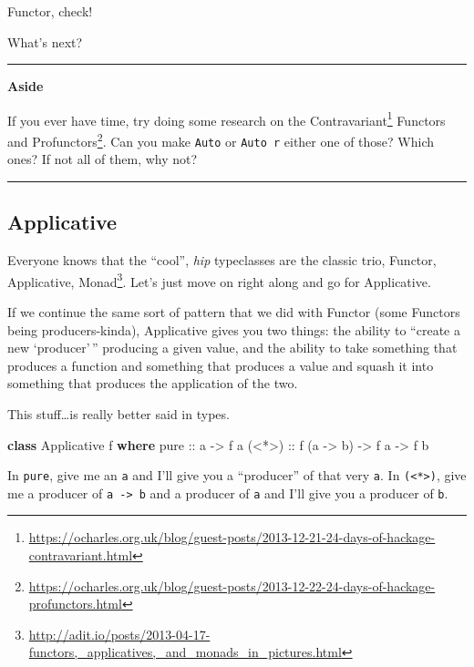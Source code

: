 \documentclass[]{article}
\newenvironment{Shaded}{}{}
\newcommand{\DataTypeTok}[1]{\textcolor[rgb]{0.56,0.13,0.00}{#1}}
\newcommand{\KeywordTok}[1]{\textcolor[rgb]{0.00,0.44,0.13}{\textbf{#1}}}
\newcommand{\NormalTok}[1]{#1}
\newcommand{\OtherTok}[1]{\textcolor[rgb]{0.00,0.44,0.13}{#1}}
\renewcommand{\href}[2]{#2\footnote{\url{#1}}}
\begin{document}
Functor, check!

What's next?

\begin{center}\rule{0.5\linewidth}{\linethickness}\end{center}

\textbf{Aside}

If you ever have time, try doing some research on the
\href{https://ocharles.org.uk/blog/guest-posts/2013-12-21-24-days-of-hackage-contravariant.html}{Contravariant}
Functors and
\href{https://ocharles.org.uk/blog/guest-posts/2013-12-22-24-days-of-hackage-profunctors.html}{Profunctors}.
Can you make \texttt{Auto} or \texttt{Auto\ r} either one of those? Which ones?
If not all of them, why not?

\begin{center}\rule{0.5\linewidth}{\linethickness}\end{center}

\hypertarget{applicative}{%
\subsection{Applicative}\label{applicative}}

Everyone knows that the ``cool'', \emph{hip} typeclasses are the classic trio,
\href{http://adit.io/posts/2013-04-17-functors,_applicatives,_and_monads_in_pictures.html}{Functor,
Applicative, Monad}. Let's just move on right along and go for Applicative.

If we continue the same sort of pattern that we did with Functor (some Functors
being producers-kinda), Applicative gives you two things: the ability to
``create a new `producer'\,'' producing a given value, and the ability to take
something that produces a function and something that produces a value and
squash it into something that produces the application of the two.

This stuff\ldots{}is really better said in types.

\begin{Shaded}
\begin{Highlighting}[]
\KeywordTok{class} \DataTypeTok{Applicative}\NormalTok{ f }\KeywordTok{where}
\OtherTok{    pure  ::}\NormalTok{ a }\OtherTok{->}\NormalTok{ f a}
\OtherTok{    (<*>) ::}\NormalTok{ f (a }\OtherTok{->}\NormalTok{ b) }\OtherTok{->}\NormalTok{ f a }\OtherTok{->}\NormalTok{ f b}
\end{Highlighting}
\end{Shaded}

In \texttt{pure}, give me an \texttt{a} and I'll give you a ``producer'' of that
very \texttt{a}. In \texttt{(\textless{}*\textgreater{})}, give me a producer of
\texttt{a\ -\textgreater{}\ b} and a producer of \texttt{a} and I'll give you a
producer of \texttt{b}.
\end{document}
